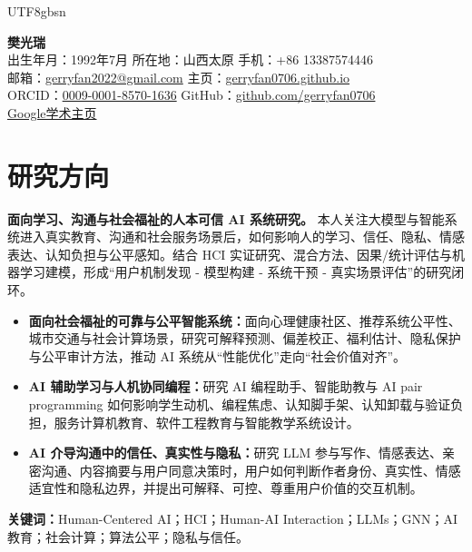 \documentclass[a4paper,10pt]{article}
\newcommand{\cvlabel}[1]{\textbf{#1}}
\begin{document}
\ifPDFTeX
\begin{CJK*}{UTF8}{gbsn}
\fi

\begin{center}
  {\LARGE\bfseries 樊光瑞}\\[0.05em]
  出生年月：1992年7月 \quad 所在地：山西太原 \quad 手机：+86 13387574446\\[0.15em]
  邮箱：\href{mailto:gerryfan2022@gmail.com}{gerryfan2022@gmail.com} \quad
  主页：\href{https://gerryfan0706.github.io}{gerryfan0706.github.io}\\[0.15em]
  ORCID：\href{https://orcid.org/0009-0001-8570-1636}{0009-0001-8570-1636} \quad
  GitHub：\href{https://github.com/gerryfan0706}{github.com/gerryfan0706}\\[0.15em]
  \href{https://scholar.google.com.hk/citations?user=GB4mzYsAAAAJ&hl=en}{Google学术主页}
\end{center}

\section*{研究方向}

\cvlabel{面向学习、沟通与社会福祉的人本可信 AI 系统研究。}
本人关注大模型与智能系统进入真实教育、沟通和社会服务场景后，如何影响人的学习、信任、隐私、情感表达、认知负担与公平感知。结合 HCI 实证研究、混合方法、因果/统计评估与机器学习建模，形成“用户机制发现 - 模型构建 - 系统干预 - 真实场景评估”的研究闭环。

\begin{itemize}
\item \cvlabel{面向社会福祉的可靠与公平智能系统：}面向心理健康社区、推荐系统公平性、城市交通与社会计算场景，研究可解释预测、偏差校正、福利估计、隐私保护与公平审计方法，推动 AI 系统从“性能优化”走向“社会价值对齐”。
  \item \cvlabel{AI 辅助学习与人机协同编程：}研究 AI 编程助手、智能助教与 AI pair programming 如何影响学生动机、编程焦虑、认知脚手架、认知卸载与验证负担，服务计算机教育、软件工程教育与智能教学系统设计。
  \item \cvlabel{AI 介导沟通中的信任、真实性与隐私：}研究 LLM 参与写作、情感表达、亲密沟通、内容摘要与用户同意决策时，用户如何判断作者身份、真实性、情感适宜性和隐私边界，并提出可解释、可控、尊重用户价值的交互机制。
  
\end{itemize}
\cvlabel{关键词：}Human-Centered AI；HCI；Human-AI Interaction；LLMs；GNN；AI 教育；社会计算；算法公平；隐私与信任。


\end{CJK*}
\end{document}
